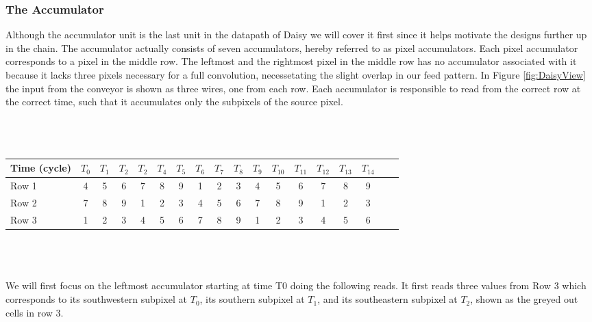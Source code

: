 \subsubsection{The Accumulator}
Although the accumulator unit is the last unit in the datapath of Daisy we will cover it first since it helps motivate the designs further up in the chain.
The accumulator actually consists of seven accumulators, hereby referred to as pixel accumulators. Each pixel accumulator corresponds to a pixel in the middle row.
The leftmost and the rightmost pixel in the middle row has no accumulator associated with it because it lacks three pixels necessary for a full convolution, necessetating the slight overlap in our feed pattern.
In Figure \ref{fig:DaisyView} the input from the conveyor is shown as three wires, one from each row.  
Each accumulator is responsible to read from the correct row at the correct time, such that it accumulates only the subpixels of the source pixel.\\ \\ \\
\\
\begin{tabular}{l*{16}{c}r}
    Time (cycle)        & $T_{0}$ & $T_{1}$ & $T_{2}$ & $T_{2}$ & $T_{4}$  & $T_{5}$ & $T_{6}$ & $T_{7}$ & $T_{8}$ & $T_{9}$ & $T_{10}$ & $T_{11}$ & $T_{12}$ & $T_{13}$ & $T_{14}$\\
\hline
Row 1                   & 4 & 5 & 6 & 7 & 8 & 9 & \cellcolor{gray75} 1 & \cellcolor{gray75} 2 & \cellcolor{gray75} 3 & 4 & 5 & 6 & 7 & 8 & 9 & \\
Row 2                   & 7 & 8 & 9 & \cellcolor{gray75} 1 & \cellcolor{gray75} 2 & \cellcolor{gray75} 3 & 4 & 5 & 6 & 7 & 8 & 9 & \cellcolor{gray75} 1 & \cellcolor{gray75} 2 & \cellcolor{gray75} 3 & \\
Row 3                   & \cellcolor{gray75} 1 & \cellcolor{gray75} 2 & \cellcolor{gray75} 3 & 4 & 5 & 6 & 7 & 8 & 9 & \cellcolor{gray75} 1 & \cellcolor{gray75} 2 & \cellcolor{gray75} 3 & 4 & 5 & 6 & \\
\end{tabular}\\ \\ \\
We will first focus on the leftmost accumulator starting at time T0 doing the following reads. 
It first reads three values from Row 3 which corresponds to its southwestern subpixel at $T_{0}$, its southern subpixel at $T_{1}$, and its southeastern subpixel at $T_{2}$, shown as the greyed out cells in row 3.
